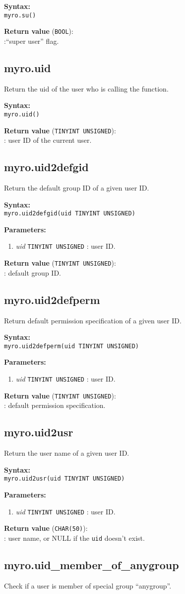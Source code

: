 \documentclass[12pt,titlepage]{article}
\newcommand{\syntax}[1]
{
  \bigskip
  \noindent
  \textbf{Syntax: } \\ 
  \indent \texttt{#1}
}
\newenvironment{parameters}
{
  \bigskip
  \noindent
  \textbf{Parameters:}
  \begin{enumerate}
}
{
  \end{enumerate}
}
\newcommand{\param}[2]
{
  \item \textit{#1} \texttt{#2} 
}
\newcommand{\return}[1]
{
  \bigskip
  \noindent
  \textbf{Return value} (\texttt{#1}): \\
  \indent
}
\begin{document}
\syntax{myro.su()}

\return{BOOL}:``super user'' flag.

%
\subsection{myro.uid}
Return the uid of the user who is calling the function.

\syntax{myro.uid()}

\return{TINYINT UNSIGNED}: user ID of the current user.

%
\subsection{myro.uid2defgid}
Return the default group ID of a given user ID.

\syntax{myro.uid2defgid(uid TINYINT UNSIGNED)}

\begin{parameters}
\param{uid}{TINYINT UNSIGNED}: user ID.
\end{parameters}

\return{TINYINT UNSIGNED}: default group ID.

%
\subsection{myro.uid2defperm}
Return default permission specification of a given user ID.

\syntax{myro.uid2defperm(uid TINYINT UNSIGNED)}

\begin{parameters}
\param{uid}{TINYINT UNSIGNED}: user ID.
\end{parameters}

\return{TINYINT UNSIGNED}: default permission specification.

%
\subsection{myro.uid2usr}
Return the user name of a given user ID.

\syntax{myro.uid2usr(uid TINYINT UNSIGNED)}

\begin{parameters}
\param{uid}{TINYINT UNSIGNED}: user ID.
\end{parameters}

\return{CHAR(50)}: user name, or NULL if the \verb|uid| doesn't exist.

%
\subsection{myro.uid\_member\_of\_anygroup}
Check if a user is member of special group ``anygroup''.
\end{document}
